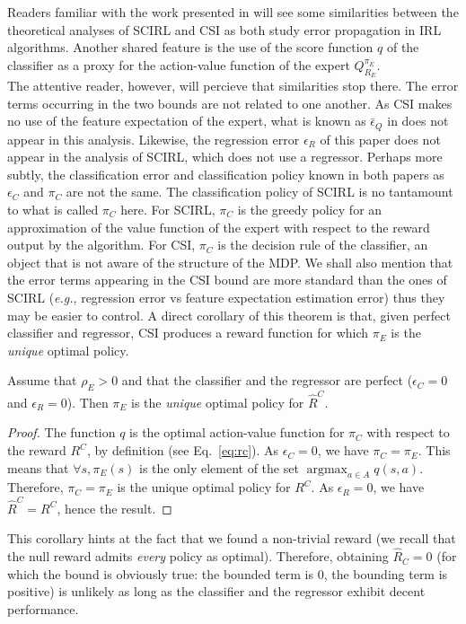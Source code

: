 \documentclass{llncs}
\newcommand{\argmax}{\operatorname*{argmax}} %
\begin{document}
Readers familiar with the work presented in \cite{klein2012scirl} will see some similarities between the theoretical analyses of SCIRL and CSI as both study error propagation in IRL algorithms. Another shared feature is the use of the score function $q$ of the classifier as a proxy for the action-value function of the expert $Q^{\pi_E}_{R_E}$. \\
The attentive reader, however, will percieve that similarities stop there. The error terms occurring in the two bounds are not related to one another. As CSI makes no use of the feature expectation of the expert, what is known as $\bar\epsilon_Q$ in \cite{klein2012scirl} does not appear in this analysis. Likewise, the regression error $\epsilon_R$ of this paper does not appear in the analysis of SCIRL, which does not use a regressor. Perhaps more subtly, the classification error and classification policy known in both papers as $\epsilon_C$ and $\pi_C$ are not the same. The classification policy of SCIRL is no tantamount to what is called $\pi_C$ here. For SCIRL, $\pi_C$ is the greedy policy for an approximation of the value function of the expert with respect to the reward output by the algorithm. For CSI, $\pi_C$ is the decision rule of the classifier, an object that is not aware of the structure of the MDP. We shall also mention that the error terms appearing in the CSI bound are more standard than the ones of SCIRL ({\it e.g.}, regression error vs feature expectation estimation error) thus they may be easier to control.
A direct corollary of this theorem is that, given perfect classifier and regressor, CSI produces a reward function for which $\pi_E$ is the \emph{unique} optimal policy.
\begin{corollary}
  \label{cor}
  Assume that $\rho_E>0$ and that the classifier and the regressor are perfect ($\epsilon_C = 0$ and $\epsilon_R = 0$). Then $\pi_E$ is the \emph{unique} optimal policy for $\hat R^C$.
\end{corollary}
\begin{proof}

  The function $q$ is the optimal action-value function for $\pi_C$ with respect to the reward $R^C$, by definition (see Eq.~\eqref{eq:rc}).
  As $\epsilon_C = 0$, we have $\pi_C = \pi_E$. This means that $\forall s, \pi_E(s)$ is the only element of the set $\argmax_{a\in A}q(s,a)$. Therefore, $\pi_C = \pi_E$ is the unique optimal policy for $R^C$.
  As $\epsilon_R = 0$, we have $\hat R^C = R^C$, hence the result.
\end{proof}
This corollary hints at the fact that we found a non-trivial reward (we recall that the null reward admits \emph{every} policy as optimal). Therefore, obtaining  $\hat{R}_C = 0$ (for which the bound is obviously true: the bounded term is $0$, the bounding term is positive) is unlikely as long as the classifier and the regressor exhibit decent performance.
\end{document}
